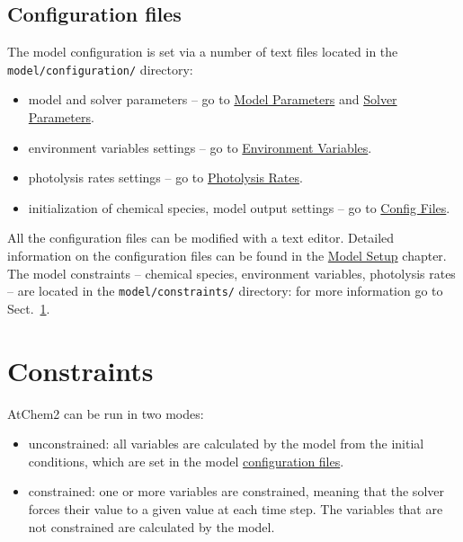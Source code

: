 \subsection{Configuration files} \label{subsec:configuration-files}

The model configuration is set via a number of text files located in
the \texttt{model/configuration/} directory:

\begin{itemize}
\item model and solver parameters -- go to
  \hyperref[sec:model-parameters]{Model Parameters} and
  \hyperref[sec:solver-parameters]{Solver Parameters}.
\item environment variables settings -- go to
  \hyperref[sec:environment-variables]{Environment Variables}.
\item photolysis rates settings -- go to
  \hyperref[sec:photolysis-rates]{Photolysis Rates}.
\item initialization of chemical species, model output settings -- go
  to \hyperref[sec:config-files]{Config Files}.
\end{itemize}

All the configuration files can be modified with a text
editor. Detailed information on the configuration files can be found
in the \hyperref[ch:setup]{Model Setup} chapter. The model constraints
-- chemical species, environment variables, photolysis rates -- are
located in the \texttt{model/constraints/} directory: for more
information go to Sect.~\ref{sec:constraints}.

\section{Constraints} \label{sec:constraints}

AtChem2 can be run in two modes:

\begin{itemize}
\item unconstrained: all variables are calculated by the model from
  the initial conditions, which are set in the model
  \hyperref[sec:config-files]{configuration files}.
\item constrained: one or more variables are constrained, meaning that
  the solver forces their value to a given value at each time
  step. The variables that are not constrained are calculated by the
  model.
\end{itemize}

